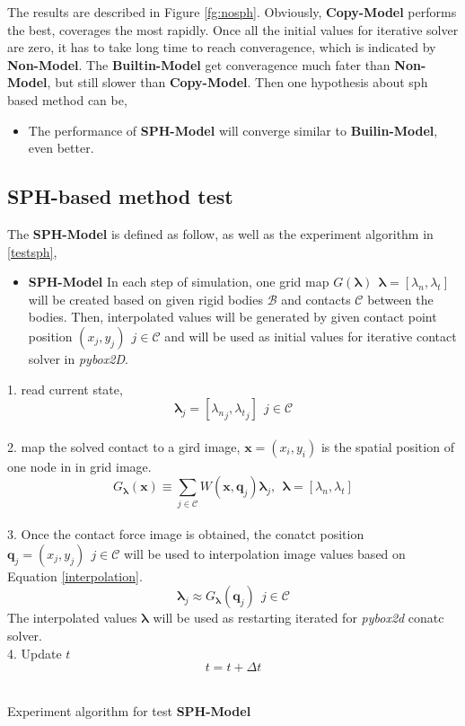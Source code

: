     The results are described in Figure \ref{fg:nosph}. Obviously, \textbf{Copy-Model} performs the best, coverages the most rapidly. Once all the initial values for iterative solver are zero, it has to take long time to reach converagence, which is indicated by \textbf{Non-Model}. The \textbf{Builtin-Model} get converagence much fater than \textbf{Non-Model}, but still slower than \textbf{Copy-Model}. Then one hypothesis about sph based method can be,
    \begin{itemize}
        \item The performance of \textbf{SPH-Model} will converge similar to \textbf{Builin-Model}, even better.
    \end{itemize}

\subsection{SPH-based method test}
    The \textbf{SPH-Model} is defined as follow, as well as the experiment algorithm in \ref{testsph},
    \begin{itemize}
         \item \textbf{SPH-Model} In each step of simulation, one grid map $G(\mathbf{\pmb{\lambda}})~~\pmb{\lambda} = [\lambda_n, \lambda_t]$ will be created based on given rigid bodies $\mathcal{B}$ and contacts $\mathcal{C}$ between the bodies. Then, interpolated values will be generated by given contact point position $(x_j, y_j)~~j \in \mathcal{C}$ and will be used as initial values for iterative contact solver in \textit{pybox2D}. 
    \end{itemize}
    \begin{algorithm}[!h]
        {
            1. read current state,
                $$\pmb{\lambda}_{j}=[{\lambda_{n}}_{j}, {\lambda_{t}}_{j}]~~j\in\mathcal{C}$$ \\
            2. map the solved contact to a gird image, $\mathbf{x}=(x_i, y_i)$ is the spatial position of one node in in grid image.
                $$G_{\pmb{\lambda}}(\mathbf{x}) \equiv \sum_{j \in \mathcal{C}} W(\mathbf{x}, \pmb{q}_{j})\pmb{\lambda}_{j},~~\pmb{\lambda}=[\lambda_n, \lambda_t]$$ \\
            3. Once the contact force image is obtained,  the conatct position $\pmb{q}_{j} = (x_{j}, y_{j})~~j\in\mathcal{C}$  will be used to interpolation image values based on Equation \ref{interpolation}.
                $$\pmb{\lambda}_j \approx G_{\pmb{\lambda}}(\pmb{q}_j)~~j\in\mathcal{C}$$ 
            The interpolated values $\pmb{\lambda}$ will be used as restarting iterated for \textit{pybox2d} conatc solver. \\
            4. Update $t$
                $$t = t + \Delta t$$ \\
        }
        \caption{Experiment algorithm for test \textbf{SPH-Model}}
        \label{testsph}
    \end{algorithm}
